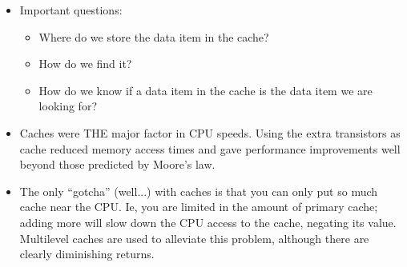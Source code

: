 
\begin{frame}[fragile]
\begin{itemize}
\item Important questions:
\begin{itemize}
\item Where do we store the data item in the cache?
\item How do we find it?
\item How do we know if a data item in the cache is the data item we are looking for?
\end{itemize}
\end{itemize}
\BNotes\ifnum{}
\begin{itemize}
\item Caches were THE major factor in CPU speeds.  Using the extra transistors
  as cache reduced memory access times and gave performance improvements well
  beyond those predicted by Moore's law.
\item The only ``gotcha'' (well...) with caches is that you can only put
  so much cache near the CPU.  Ie, you are limited in the amount of primary
  cache; adding more will slow down the CPU access to the cache, negating
  its value.  Multilevel caches are used to alleviate this problem,
  although there are clearly diminishing returns.
\end{itemize}
\fi\ENotes
\end{frame}

